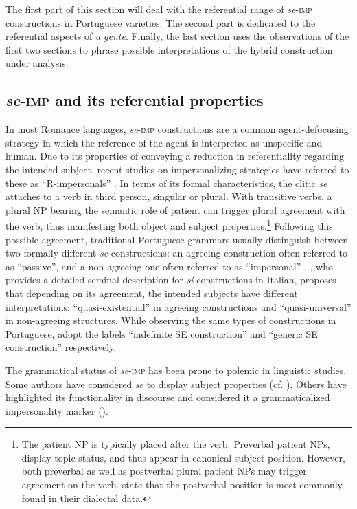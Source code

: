 \documentclass[output=paper]{langscibook}
\begin{document}
The first part of this section will deal with the referential range of \textit{se}-\textsc{imp} constructions in Portuguese varieties. The second part is dedicated to the referential aspects of \textit{a gente}. Finally, the last section uses the observations of the first two sections to phrase possible interpretations of the hybrid construction under analysis.

\subsection{\textit{se}-\textsc{imp} and its referential properties}\label{sec:henriques:4.1}

In most Romance languages, \textit{se}-\textsc{imp} constructions are a common agent-de\-fo\-cus\-ing strategy in which the reference of the agent is interpreted as unspecific and human. Due to its properties of conveying a reduction in referentiality regarding the intended subject, recent studies on impersonalizing strategies have referred to these as “R-impersonals” \citep{Siewierska2011}. In terms of its formal characteristics, the clitic \textit{se} attaches to a verb in third person, singular or plural. With transitive verbs, a plural NP bearing the semantic role of patient can trigger plural agreement with the verb, thus manifesting both object and subject properties.\footnote{The patient NP is typically placed after the verb. Preverbal patient NPs, display topic status, and thus appear in canonical subject position. However, both preverbal as well as postverbal plural patient NPs may trigger agreement on the verb. \citet[187]{PosioVilkuna2013} state that the postverbal position is most commonly found in their dialectal data.} Following this possible agreement, traditional Portuguese grammars usually distinguish between two formally different \textit{se} constructions: an agreeing construction often referred to as “passive”, and a non-agreeing one often referred to as “impersonal” \citep{Naro1976}. \citet{Cinque1988}, who provides a detailed seminal description for \textit{si} constructions in Italian, proposes that depending on its agreement, the intended subjects have different interpretations: “quasi-existential” in agreeing constructions and “quasi-universal” in non-agreeing structures. While observing the same types of constructions in Portuguese, \citet[750]{RaposoUriagereka1996} adopt the labels “indefinite SE construction” and “generic SE construction” respectively.


The grammatical status of \textit{se}-\textsc{imp} has been prone to polemic in linguistic studies. Some authors have considered \textit{se} to display subject properties (cf. \citealt{Martins2009,Martins2005,Martins2003, RaposoUriagereka1996}). Others have highlighted its functionality in discourse and considered it a grammaticalized impersonality marker (\citealt{PosioVilkuna2013}).
\end{document}
